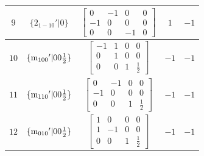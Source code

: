 \documentclass[fleqn,8pt]{jsarticle}
\begin{document}
\begin{longtable}{ccccc}
$ 9 $ & $ \{2{}_{1-10}{}'|0\} $ & $ \begin{bmatrix} 0 & -1 & 0 & 0 \\ -1 & 0 & 0 & 0 \\ 0 & 0 & -1 & 0 \end{bmatrix} $ & $ 1 $ & $ -1 $ \\ \hline
$ 10 $ & $ \{{\rm m}_{100}{}'|0 0 \frac{1}{2}\} $ & $ \begin{bmatrix} -1 & 1 & 0 & 0 \\ 0 & 1 & 0 & 0 \\ 0 & 0 & 1 & \frac{1}{2} \end{bmatrix} $ & $ -1 $ & $ -1 $ \\ \hline
$ 11 $ & $ \{{\rm m}_{110}{}'|0 0 \frac{1}{2}\} $ & $ \begin{bmatrix} 0 & -1 & 0 & 0 \\ -1 & 0 & 0 & 0 \\ 0 & 0 & 1 & \frac{1}{2} \end{bmatrix} $ & $ -1 $ & $ -1 $ \\ \hline
$ 12 $ & $ \{{\rm m}_{010}{}'|0 0 \frac{1}{2}\} $ & $ \begin{bmatrix} 1 & 0 & 0 & 0 \\ 1 & -1 & 0 & 0 \\ 0 & 0 & 1 & \frac{1}{2} \end{bmatrix} $ & $ -1 $ & $ -1 $ \\
\end{longtable}
\end{document}
